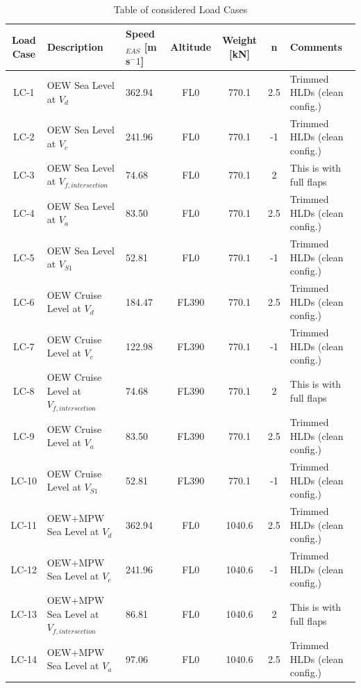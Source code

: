 \begin{longtable}{|>{\columncolor{blue!15}}c|p{3.2cm}|p{2cm}|c|c|c|p{2.6cm}|}
\caption{Table of considered Load Cases}
\label{tab:LoadCases}
\endfirsthead
    \hline
    \rowcolor{blue!15} \textbf{Load Case} & \textbf{Description} & \textbf{Speed$_{EAS}$ [m s$^-1$]} & \textbf{Altitude} & \textbf{Weight [kN]} & \textbf{n} & \textbf{Comments} \\
    \hline
    LC-1 & OEW Sea Level at $V_{d}$ & 362.94 & FL0 & 770.1 & 2.5 & Trimmed HLDs (clean config.) \\
    \hline
    LC-2 & OEW Sea Level at $V_{c}$ & 241.96 & FL0 & 770.1 & -1 & Trimmed HLDs (clean config.) \\ 
    \hline
    LC-3 & OEW Sea Level at $V_{f,intersection}$ & 74.68 & FL0 & 770.1 & 2 & This is with full flaps \\ \hline
    LC-4 & OEW Sea Level at $V_{a}$ & 83.50 & FL0 & 770.1 & 2.5 & Trimmed HLDs (clean config.) \\ 
    \hline
    LC-5 & OEW Sea Level at $V_{S1}$ & 52.81 & FL0 & 770.1 & -1 & Trimmed HLDs (clean config.) \\ 
    \hline
    LC-6 & OEW Cruise Level at $V_{d}$ & 184.47 & FL390 & 770.1 & 2.5 & Trimmed HLDs (clean config.) \\ 
    \hline
    LC-7 & OEW Cruise Level at $V_{c}$ & 122.98 & FL390 & 770.1 & -1 & Trimmed HLDs (clean config.) \\ 
    \hline
    LC-8 & OEW Cruise Level at $V_{f,intersection}$ & 74.68 & FL390 & 770.1 & 2 & This is with full flaps \\ 
    \hline
    LC-9 & OEW Cruise Level at $V_{a}$ & 83.50 & FL390 & 770.1 & 2.5 & Trimmed HLDs (clean config.) \\ 
    \hline
    LC-10 & OEW Cruise Level at $V_{S1}$ & 52.81 & FL390 & 770.1 & -1 & Trimmed HLDs (clean config.) \\ 
    \hline
    LC-11 & OEW+MPW Sea Level at $V_{d}$ & 362.94 & FL0 & 1040.6 & 2.5 & Trimmed HLDs (clean config.) \\ 
    \hline
    LC-12 & OEW+MPW Sea Level at $V_{c}$ & 241.96 & FL0 & 1040.6& -1 & Trimmed HLDs (clean config.) \\ 
    \hline
    LC-13 & OEW+MPW Sea Level at $V_{f,intersection}$ & 86.81 & FL0 & 1040.6 & 2 & This is with full flaps \\ 
    \hline
    LC-14 & OEW+MPW Sea Level at $V_{a}$ & 97.06 & FL0 & 1040.6 & 2.5 & Trimmed HLDs (clean config.) \\
    \hline

\end{longtable}
